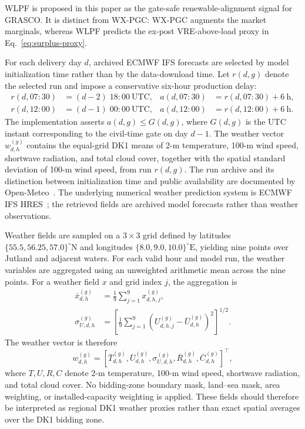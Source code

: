 \documentclass[11pt,a4paper]{article}
\begin{document}
WLPF is proposed in this paper as the gate-safe renewable-alignment signal for
GRASCO.  It is distinct from WX-PGC: WX-PGC augments the market marginals,
whereas WLPF predicts the ex-post VRE-above-load proxy in
Eq.~\eqref{eq:surplus-proxy}.

For each delivery day $d$, archived ECMWF IFS forecasts are selected by model
initialization time rather than by the data-download time.  Let $r(d,g)$ denote
the selected run and impose a conservative six-hour production delay:
\begin{align}
  r(d,07{:}30)&=(d-2)\;18{:}00\ \mathrm{UTC},
  &a(d,07{:}30)&=r(d,07{:}30)+6\ \mathrm{h},
  \label{eq:weather-run-0730}\\
  r(d,12{:}00)&=(d-1)\;00{:}00\ \mathrm{UTC},
  &a(d,12{:}00)&=r(d,12{:}00)+6\ \mathrm{h}.
  \label{eq:weather-run-1200}
\end{align}
The implementation asserts $a(d,g)\leq G(d,g)$, where $G(d,g)$ is the UTC
instant corresponding to the civil-time gate on day $d-1$.  The weather vector
$w^{(g)}_{d,h}$ contains the equal-grid DK1 means of 2-m temperature, 100-m
wind speed, shortwave radiation, and total cloud cover, together with the
spatial standard deviation of 100-m wind speed, from run $r(d,g)$.  The run
archive and its distinction between initialization time and public availability
are documented by Open-Meteo~\cite{openmeteo2026singleruns}.  The underlying
numerical weather prediction system is ECMWF IFS HRES~\cite{ecmwfifs}; the
retrieved fields are archived model forecasts rather than weather observations.

Weather fields are sampled on a $3\times3$ grid defined by latitudes
$\{55.5,56.25,57.0\}^{\circ}\mathrm{N}$ and longitudes
$\{8.0,9.0,10.0\}^{\circ}\mathrm{E}$, yielding nine points over Jutland
and adjacent waters.  For each valid hour and model run, the weather
variables are aggregated using an unweighted arithmetic mean across the nine
points.  For a weather field $x$ and grid index $j$, the aggregation is
\begin{align}
  \overline{x}^{(g)}_{d,h}
  &=\frac{1}{9}\sum_{j=1}^{9}x^{(g)}_{d,h,j},
  \label{eq:weather-grid-mean}\\
  \sigma^{(g)}_{U,d,h}
  &=\left[\frac{1}{9}\sum_{j=1}^{9}
  \left(U^{(g)}_{d,h,j}-\overline U^{(g)}_{d,h}\right)^2\right]^{1/2}.
  \label{eq:weather-wind-spread}
\end{align}
The weather vector is therefore
\begin{equation}
  w^{(g)}_{d,h}
  =\left[
  \overline T^{(g)}_{d,h},\overline U^{(g)}_{d,h},
  \sigma^{(g)}_{U,d,h},\overline R^{(g)}_{d,h},
  \overline C^{(g)}_{d,h}
  \right]^{\top},
  \label{eq:weather-vector}
\end{equation}
where $T,U,R,C$ denote 2-m temperature, 100-m wind speed, shortwave
radiation, and total cloud cover.  No bidding-zone boundary mask, land--sea mask, area weighting, or
installed-capacity weighting is applied.  These fields should therefore be
interpreted as regional DK1 weather proxies rather than exact spatial averages
over the DK1 bidding zone.
\end{document}
